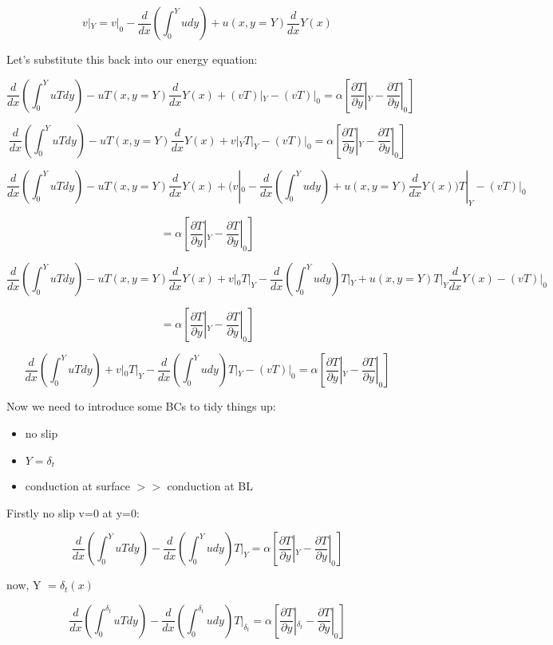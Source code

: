 \documentclass[11pt]{article}
\begin{document}
$$v|_Y = v|_0 -\frac{d}{dx} \left( \int_{0}^{Y} u dy \right) + u(x,y=Y) \frac{d}{dx}Y(x)$$

Let's substitute this back into our energy equation:

$$ \frac{d}{dx} \left( \int_{0}^{Y} uT dy \right) - uT(x,y=Y) \frac{d}{dx}Y(x)  + (vT)|_Y - (vT)|_0 = \alpha [\frac{\partial T}{\partial y}|_Y -  \frac{\partial T}{\partial y} |_0] $$ 

$$ \frac{d}{dx} \left( \int_{0}^{Y} uT dy \right) - uT(x,y=Y) \frac{d}{dx}Y(x)  + v|_Y T|_Y - (vT)|_0 = \alpha [\frac{\partial T}{\partial y}|_Y -  \frac{\partial T}{\partial y} |_0] $$ 



$$ \frac{d}{dx} \left( \int_{0}^{Y} uT dy \right) - uT(x,y=Y) \frac{d}{dx}Y(x)  + (v|_0 -\frac{d}{dx} \left( \int_{0}^{Y} u dy \right) + u(x,y=Y) \frac{d}{dx}Y(x)) T|_Y - (vT)|_0 $$

$$= \alpha [\frac{\partial T}{\partial y}|_Y -  \frac{\partial T}{\partial y} |_0] $$ 


$$ \frac{d}{dx} \left( \int_{0}^{Y} uT dy \right) - uT(x,y=Y) \frac{d}{dx}Y(x)  + v|_0 T|_Y -\frac{d}{dx} \left( \int_{0}^{Y} u dy \right)T|_Y + u(x,y=Y)T|_Y \frac{d}{dx}Y(x)  - (vT)|_0 $$

$$= \alpha [\frac{\partial T}{\partial y}|_Y -  \frac{\partial T}{\partial y} |_0] $$ 

$$ \frac{d}{dx} \left( \int_{0}^{Y} uT dy \right)   + v|_0 T|_Y -\frac{d}{dx} \left( \int_{0}^{Y} u dy \right)T|_Y  - (vT)|_0 = \alpha [\frac{\partial T}{\partial y}|_Y -  \frac{\partial T}{\partial y} |_0] $$ 

Now we need to introduce some BCs to tidy things up:

\begin{itemize}
\item no slip
\item $Y=\delta_t$
\item conduction at surface $>>$ conduction at BL
\end{itemize}

Firstly no slip v=0 at y=0:


$$ \frac{d}{dx} \left( \int_{0}^{Y} uT dy \right)   -\frac{d}{dx} \left( \int_{0}^{Y} u dy \right)T|_Y   = \alpha [\frac{\partial T}{\partial y}|_Y -  \frac{\partial T}{\partial y} |_0] $$ 

now, Y $=\delta_t (x)$

$$ \frac{d}{dx} \left( \int_{0}^{\delta_t} uT dy \right)   -\frac{d}{dx} \left( \int_{0}^{\delta_t} u dy \right)T|_{\delta_t}   = \alpha [\frac{\partial T}{\partial y}|_{\delta_t} -  \frac{\partial T}{\partial y} |_0] $$ 
\end{document}
